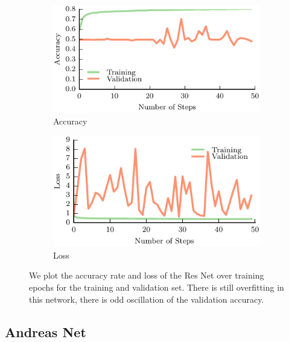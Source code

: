 \begin{figure}[t!]
    \centering
    \begin{subfigure}[t]{0.49\textwidth}
        \includegraphics[width=0.9\columnwidth]{figs/res_net_accuracy.pdf}
        \caption{Accuracy} \label{fig:accuracy}
        \end{subfigure}
    \begin{subfigure}[t]{0.49\textwidth}
        \includegraphics[width=0.9\columnwidth]{figs/res_net_loss.pdf}
        \caption{Loss} \label{fig:loss}
    \end{subfigure}
\caption{We plot the accuracy rate and loss of the Res Net over training epochs for the training and validation set. There is still overfitting in this network, there is odd oscillation of the validation accuracy.} \label{fig:resnet_results}
\end{figure}

\subsection{Andreas Net}


